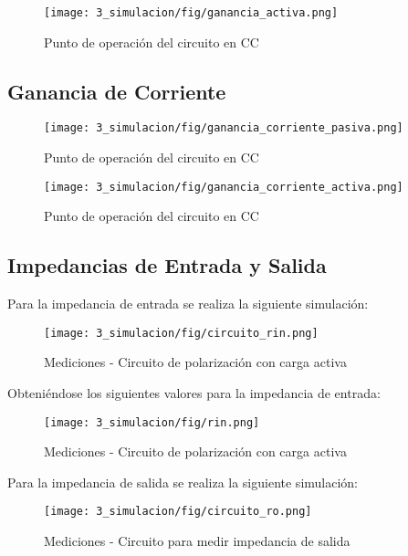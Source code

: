 \begin{figure}[H]
    \centering
    \texttt{[image: 3\_simulacion/fig/ganancia\_activa.png]}
    \label{mediciones_pol_activa}
    \caption{Punto de operación del circuito en CC}
\end{figure}

\subsection{Ganancia de Corriente}

\begin{figure}[H]
    \centering
    \texttt{[image: 3\_simulacion/fig/ganancia\_corriente\_pasiva.png]}
    \label{mediciones_pol_activa}
    \caption{Punto de operación del circuito en CC}
\end{figure}


\begin{figure}[H]
    \centering
    \texttt{[image: 3\_simulacion/fig/ganancia\_corriente\_activa.png]}
    \label{mediciones_pol_activa}
    \caption{Punto de operación del circuito en CC}
\end{figure}



\subsection{Impedancias de Entrada y Salida}
Para la impedancia de entrada se realiza la siguiente simulación:
\begin{figure}[H]
    \centering
    \texttt{[image: 3\_simulacion/fig/circuito\_rin.png]}
    \label{mediciones_pol_activa}
    \caption{Mediciones - Circuito de polarización con carga activa}
\end{figure}
Obteniéndose los siguientes valores para la impedancia de entrada:
\begin{figure}[H]
    \centering
    \texttt{[image: 3\_simulacion/fig/rin.png]}
    \label{mediciones_pol_activa}
    \caption{Mediciones - Circuito de polarización con carga activa}
\end{figure}

Para la impedancia de salida se realiza la siguiente simulación:
\begin{figure}[H]
    \centering
    \texttt{[image: 3\_simulacion/fig/circuito\_ro.png]}
    \label{mediciones_pol_activa}
    \caption{Mediciones - Circuito para medir impedancia de salida}
\end{figure}

